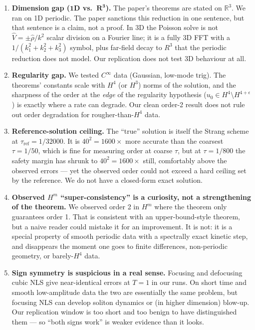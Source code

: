 \documentclass[11pt]{article}
\begin{document}
\begin{enumerate}
\item \textbf{Dimension gap ($\mathbf{1D}$ vs.\ $\mathbf{R^3}$).} The paper's
theorems are stated on $\mathbb{R}^3$. We ran on 1D periodic. The paper
sanctions this reduction in one sentence, but that sentence is a claim, not a
proof. In 3D the Poisson solve is not $\hat V=\pm\hat\rho/k^2$ scalar
division on a Fourier line; it is a fully 3D FFT with a $1/(k_1^2+k_2^2+k_3^2)$
symbol, plus far-field decay to $R^3$ that the periodic reduction does not
model. Our replication does not test 3D behaviour at all.

\item \textbf{Regularity gap.} We tested $C^\infty$ data (Gaussian, low-mode
trig). The theorems' constants scale with $H^4$ (or $H^3$) norms of the
solution, and the sharpness of the order at the \emph{edge} of the regularity
hypothesis ($u_0\in H^4\setminus H^{4+\epsilon}$) is exactly where a rate can
degrade. Our clean order-2 result does not rule out order degradation for
rougher-than-$H^4$ data.

\item \textbf{Reference-solution ceiling.} The ``true'' solution is itself the
Strang scheme at $\tau_{\mathrm{ref}}=1/32000$. It is $40^2\!=\!1600\times$
more accurate than the coarsest $\tau=1/50$, which is fine for measuring
order at coarse $\tau$, but at $\tau=1/800$ the safety margin has shrunk to
$40^2=1600\times$ still, comfortably above the observed errors --- yet the
observed order could not exceed a hard ceiling set by the reference. We do
not have a closed-form exact solution.

\item \textbf{Observed $H^m$ ``super-consistency'' is a curiosity, not a
strengthening of the theorem.} We observed order 2 in $H^m$ where the theorem
only guarantees order 1. That is consistent with an upper-bound-style
theorem, but a naive reader could mistake it for an improvement. It is not:
it is a special property of smooth periodic data with a spectrally exact
kinetic step, and disappears the moment one goes to finite differences,
non-periodic geometry, or barely-$H^4$ data.

\item \textbf{Sign symmetry is suspicious in a real sense.} Focusing and
defocusing cubic NLS give near-identical errors at $T=1$ in our runs. On
short time and smooth low-amplitude data the two are essentially the same
problem, but focusing NLS can develop soliton dynamics or (in higher
dimension) blow-up. Our replication window is too short and too benign to
have distinguished them --- so ``both signs work'' is weaker evidence than it
looks.


\end{enumerate}
\end{document}
